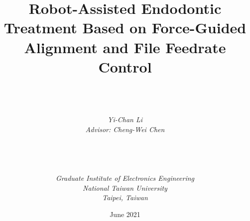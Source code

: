 \documentclass[a4paper, 12pt, twoside, openright]{mythesis}
\begin{document}
\title{\textbf{Robot-Assisted Endodontic Treatment Based on Force-Guided Alignment and File Feedrate Control}}

\author{ \\  \\ \\
{\it Yi-Chan Li}\\
{\it Advisor: Cheng-Wei Chen} \\ \\ \\ \\  \\
{\it Graduate Institute of Electronics Engineering}\\
{\it National Taiwan University} \\
{\it Taipei, Taiwan}\\ }

{\date{June 2021}}

\maketitle

\frontmatter

\tableofcontents
\listoffigures
\listoftables


\mainmatter












\end{document}
